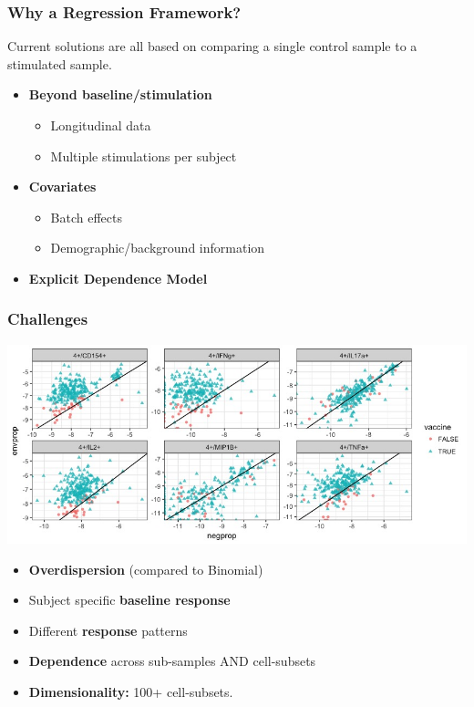 \documentclass{beamer}
\theoremstyle{definition}
\begin{document}
\begin{frame} 
\frametitle{Why a Regression Framework?}

Current solutions are all based on comparing a single control sample to a stimulated sample.
\vspace{0.5 cm}

\begin{itemize}
\item \textbf{Beyond baseline/stimulation}
	\begin{itemize}
	\item Longitudinal data
	\item Multiple stimulations per subject
	\end{itemize}
\vspace{0.65 cm}
	
\item \textbf{Covariates}
	\begin{itemize}
	\item Batch effects
	\item Demographic/background information
	\end{itemize}
\vspace{0.65 cm}

	
\item \textbf{Explicit Dependence Model}
\end{itemize}
\end{frame}


\begin{frame}
\frametitle{Challenges} 
\begin{center}
\includegraphics[scale=0.35]{figures/marginalScatterNoPost}
\end{center}
\begin{itemize}
\item \textbf{Overdispersion} (compared to Binomial)
\item Subject specific \textbf{baseline response}
\item Different \textbf{response} patterns
\item \textbf{Dependence} across sub-samples AND cell-subsets
\item \textbf{Dimensionality:} 100+ cell-subsets. 
\end{itemize}
\end{frame}
\end{document}
